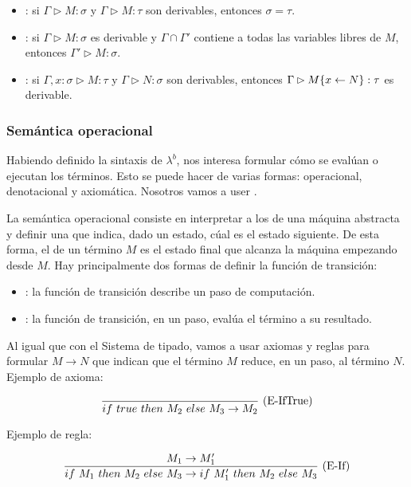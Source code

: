 \begin{itemize}
  \item {}: si $\Gamma \rhd M : \sigma$ y $\Gamma \rhd M : \tau$ son derivables, entonces $\sigma = \tau$.
  \item {}: si $\Gamma \rhd M : \sigma$ es derivable y $\Gamma \cap \Gamma'$ contiene a todas las variables libres de $M$, entonces $\Gamma' \rhd M : \sigma$.
  \item {}: si $\Gamma,x:\sigma \rhd M : \tau$ y $\Gamma \rhd N : \sigma$ son derivables, entonces $\Gamma \rhd M\{x\leftarrow N\} : \tau$ es derivable.
\end{itemize}

\subsubsection{Semántica operacional}

Habiendo definido la sintaxis de $\lambda^b$, nos interesa formular cómo se evalúan o ejecutan los términos. Esto se puede hacer de varias formas: operacional, denotacional y axiomática. Nosotros vamos a user .

La semántica operacional consiste en interpretar a los  de una máquina abstracta y definir una  que indica, dado un estado, cúal es el estado siguiente. De esta forma, el  de un término $M$ es el estado final que alcanza la máquina empezando desde $M$. Hay principalmente dos formas de definir la función de transición:

\begin{itemize}
  \item {}: la función de transición describe un paso de computación.
  \item {}: la función de transición, en un paso, evalúa el término a su resultado.
\end{itemize}

Al igual que con el Sistema de tipado, vamos a usar axiomas y reglas para formular  $M\to N$ que indican que el término $M$ reduce, en un paso, al término $N$. Ejemplo de axioma:

\[\frac{}{if\ true\ then\ M_2\ else\ M_3 \to M_2}\ \text{(E-IfTrue)}\]

Ejemplo de regla:

\[\frac{M_1 \to M_1'}{if\ M_1\ then\ M_2\ else\ M_3 \to if\ M_1'\ then\ M_2\ else\ M_3}\ \text{(E-If)}\]

